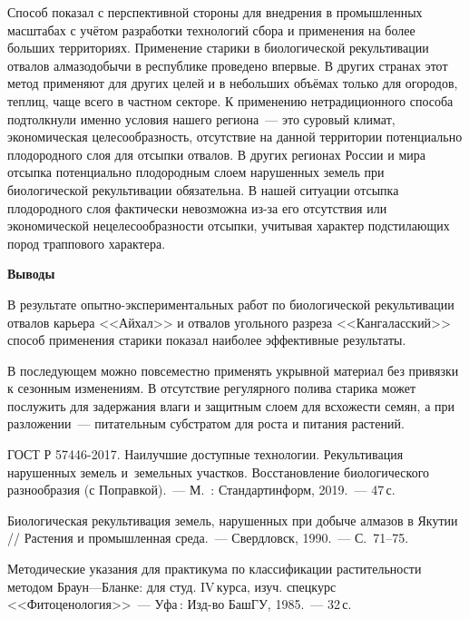 

Способ показал с перспективной стороны для внедрения в промышленных масштабах с учётом разработки технологий сбора и применения на более больших территориях. Применение старики в биологической рекультивации отвалов алмазодобычи в республике проведено впервые. В других странах этот метод применяют для других целей и в небольших объёмах только для огородов, теплиц, чаще всего в частном секторе. К применению нетрадиционного способа подтолкнули именно условия нашего региона~--- это суровый климат, экономическая целесообразность, отсутствие на данной территории потенциально плодородного слоя для отсыпки отвалов.
\clearpage
В других регионах России и мира отсыпка потенциально плодородным слоем нарушенных земель при биологической рекультивации обязательна. В нашей ситуации отсыпка плодородного слоя фактически невозможна из-за его отсутствия или экономической нецелесообразности отсыпки, учитывая характер подстилающих пород траппового характера.

\textbf{Выводы}

В результате опытно-экспериментальных работ по биологической рекультивации отвалов карьера <<Айхал>> и отвалов угольного разреза <<Кангаласский>> способ применения старики показал наиболее эффективные результаты.

В последующем можно повсеместно применять укрывной материал без привязки к сезонным изменениям. В отсутствие регулярного полива старика может послужить для задержания влаги и защитным слоем для всхожести семян, а при разложении~--- питательным субстратом для роста и питания растений.

\begin{thebibliography}{99}


\bibitem{}
ГОСТ Р 57446-2017. Наилучшие доступные технологии. Рекультивация нарушенных земель и~земельных участков. Восстановление биологического разнообразия (с Поправкой).~--- М.~: Стандартинформ, 2019.~--- 47\,с.


\bibitem{}
 Биологическая рекультивация земель, нарушенных при добыче алмазов в Якутии // Растения и промышленная среда.~--- Свердловск, 1990.~--- С.~71--75.

\bibitem{}
 Методические указания для практикума по классификации растительности методом Браун---Бланке: для студ. IV\,курса, изуч. спецкурс <<Фитоценология>>~--- Уфа\,: Изд-во БашГУ, 1985.~--- 32\,с.

\end{thebibliography}
\thispagestyle{empty}
